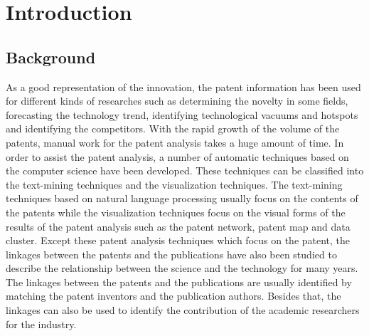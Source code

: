 \chapter{Introduction}
\label{cha:intro}


\section{Background}
As a good representation of the innovation, the patent information has been used for different kinds of researches such as determining the novelty in some fields, forecasting the technology trend, identifying technological vacuums and hotspots and identifying the competitors. With the rapid growth of the volume of the patents, manual work for the patent analysis takes a huge amount of time. In order to assist the patent analysis, a number of automatic techniques based on the computer science have been developed. These techniques can be classified into the text-mining techniques and the visualization techniques\cite{Abbas20143}. The text-mining techniques based on natural language processing usually focus on the contents of the patents while the visualization techniques focus on the visual forms of the results of the patent analysis such as the patent network, patent map and data cluster.  Except these patent analysis techniques which focus on the patent, the linkages between the patents and the publications have also been studied to describe the relationship between the science and the technology for many years. The linkages between the patents and the publications are usually identified by matching the patent inventors and the publication authors.  Besides that, the linkages can also be used to identify the contribution of the academic researchers for the industry. 

